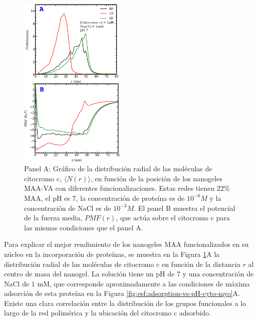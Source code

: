 
\begin{figure}[!htb]
     \centering
     \includegraphics[width=0.45\textwidth]{Figures/graphs-gel2/cito-adsr-pmf.pdf}
     \caption{Panel A: Gr\'afico de la distribuci\'on radial de las mol\'eculas de citocromo c, $\langle N(r)\rangle$, en funci\'on de la posici\'on de los nanogeles MAA-VA con diferentes funcionalizaciones.
     	Estas redes tienen 22\% MAA, el pH es 7, la concentraci\'on de prote\'ina es de $10^{-6}M$ y la concentraci\'on de NaCl es de $10^{-3}M$.
     	El panel B muestra el potencial de la fuerza media, ${PMF}(r)$, que act\'ua sobre el citocromo c para las mismas condiciones que el panel A.}
     \label{fig:esf:adsorption-vs-r-cyto}
 \end{figure}



Para explicar el mejor rendimiento de los nanogeles MAA funcionalizados en su n\'ucleo en la incorporaci\'on de prote\'inas, se muestra en la Figura \ref{fig:esf:adsorption-vs-r-cyto}A la distribuci\'on radial de las mol\'eculas de citocromo c en funci\'on de la distancia $r$ al centro de masa del nanogel. La solución tiene un pH de 7 y una concentración de NaCl de $1 $ mM, que corresponde aproximadamente a las condiciones de m\'axima adsorci\'on de esta prote\'ina en la Figura \ref{fig:esf:adsorption-vs-pH-cyto-myo}A. Existe una clara correlaci\'on entre la distribuci\'on de los grupos funcionales a lo largo de la red polim\'erica y la ubicaci\'on del citocromo c adsorbido.

